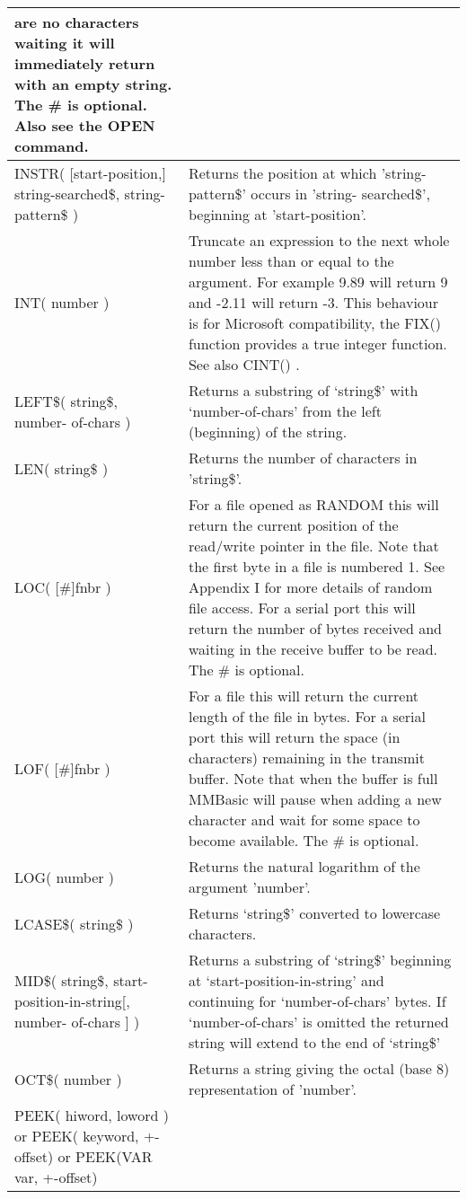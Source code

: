 \documentclass[11pt,fleqn]{book} %
\numberwithin{equation}{section} %
\numberwithin{figure}{section} %
\numberwithin{table}{section} %
\begin{document}
\begin{table}[]
\begin{tabular}{|p{4cm}|p{10cm}|}
are no characters waiting it will immediately return with an empty string.
The \# is optional. Also see the OPEN command.
\\ \hline
INSTR( [start-position,]
string-searched\$, string-
pattern\$ )
 & Returns the position at which 'string-pattern\$' occurs in 'string-
searched\$', beginning at 'start-position'.
\\ \hline
INT( number ) & Truncate an expression to the next whole number less than or equal to
the argument. For example 9.89 will return 9 and -2.11 will return -3.
This behaviour is for Microsoft compatibility, the FIX() function
provides a true integer function.
See also CINT() .
\\ \hline
LEFT\$( string\$, number-
of-chars )
 & Returns a substring of ‘string\$’ with ‘number-of-chars’ from the left
(beginning) of the string.
\\ \hline
LEN( string\$ ) & Returns the number of characters in 'string\$'.
\\ \hline
LOC( [\#]fnbr ) & For a file opened as RANDOM this will return the current position of
the read/write pointer in the file. Note that the first byte in a file is
numbered 1. See Appendix I for more details of random file access.
For a serial port this will return the number of bytes received and
waiting in the receive buffer to be read.
The \# is optional.
\\ \hline
LOF( [\#]fnbr ) & For a file this will return the current length of the file in bytes.
For a serial port this will return the space (in characters) remaining in the
transmit buffer. Note that when the buffer is full MMBasic will pause
when adding a new character and wait for some space to become
available.
The \# is optional.
\\ \hline
LOG( number ) & Returns the natural logarithm of the argument 'number'. 
\\ \hline
LCASE\$( string\$ ) & Returns ‘string\$’ converted to lowercase characters.
\\ \hline
MID\$( string\$, start-
position-in-string[, number-
of-chars ] )
 & Returns a substring of ‘string\$’ beginning at ‘start-position-in-string’
and continuing for ‘number-of-chars’ bytes. If ‘number-of-chars’ is
omitted the returned string will extend to the end of ‘string\$’
\\ \hline
OCT\$( number ) & Returns a string giving the octal (base 8) representation of 'number'.
\\ \hline
PEEK( hiword, loword )
or
PEEK( keyword, +-offset)
or
PEEK(VAR var, +-offset)

\end{tabular}
\end{table}
\end{document}
